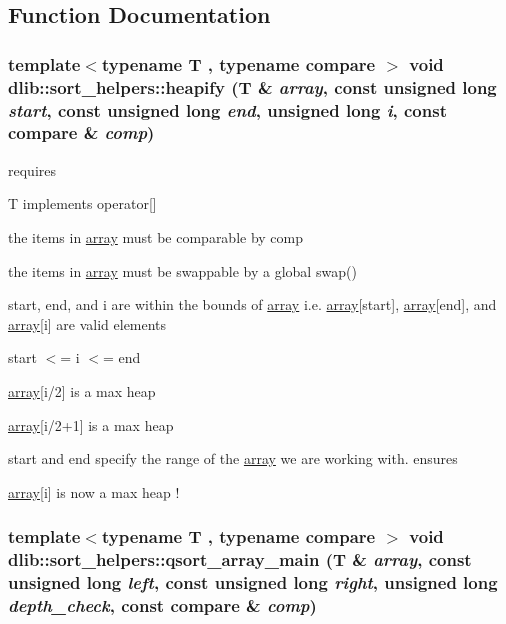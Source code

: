 \subsection{Function Documentation}
\hypertarget{namespacedlib_1_1sort__helpers_ac32391188081266e35f6b3934704a224}{
\subsubsection[{heapify}]{\setlength{\rightskip}{0pt plus 5cm}template$<$typename T , typename compare $>$ void dlib::sort\_\-helpers::heapify (T \& {\em array}, \/  const unsigned long {\em start}, \/  const unsigned long {\em end}, \/  unsigned long {\em i}, \/  const compare \& {\em comp})}}
\label{namespacedlib_1_1sort__helpers_ac32391188081266e35f6b3934704a224}
requires
\begin{DoxyItemize}
\item T implements operator\mbox{[}\mbox{]}
\item the items in \hyperlink{classdlib_1_1array}{array} must be comparable by comp
\item the items in \hyperlink{classdlib_1_1array}{array} must be swappable by a global swap()
\item start, end, and i are within the bounds of \hyperlink{classdlib_1_1array}{array} i.e. \hyperlink{classdlib_1_1array}{array}\mbox{[}start\mbox{]}, \hyperlink{classdlib_1_1array}{array}\mbox{[}end\mbox{]}, and \hyperlink{classdlib_1_1array}{array}\mbox{[}i\mbox{]} are valid elements
\item start $<$= i $<$= end
\item \hyperlink{classdlib_1_1array}{array}\mbox{[}i/2\mbox{]} is a max heap
\item \hyperlink{classdlib_1_1array}{array}\mbox{[}i/2+1\mbox{]} is a max heap
\item start and end specify the range of the \hyperlink{classdlib_1_1array}{array} we are working with. ensures
\item \hyperlink{classdlib_1_1array}{array}\mbox{[}i\mbox{]} is now a max heap ! 
\end{DoxyItemize}\hypertarget{namespacedlib_1_1sort__helpers_ab2a0fe3633430a6436f3997846e2b231}{
\subsubsection[{qsort\_\-array\_\-main}]{\setlength{\rightskip}{0pt plus 5cm}template$<$typename T , typename compare $>$ void dlib::sort\_\-helpers::qsort\_\-array\_\-main (T \& {\em array}, \/  const unsigned long {\em left}, \/  const unsigned long {\em right}, \/  unsigned long {\em depth\_\-check}, \/  const compare \& {\em comp})}}
